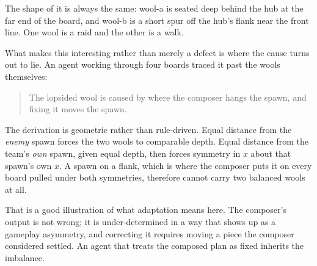 The shape of it is always the same: wool-a is seated deep behind the hub at the
far end of the board, and wool-b is a short spur off the hub's flank near the
front line. One wool is a raid and the other is a walk.

What makes this interesting rather than merely a defect is where the cause turns
out to lie. An agent working through four boards traced it past the wools
themselves:

\begin{quote}
The lopsided wool is caused by where the composer hangs the spawn, and fixing it
moves the spawn.
\end{quote}

The derivation is geometric rather than rule-driven. Equal distance from the
\emph{enemy} spawn forces the two wools to comparable depth. Equal distance from
the team's \emph{own} spawn, given equal depth, then forces symmetry in $x$ about
that spawn's own $x$. A spawn on a flank, which is where the composer puts it on
every board pulled under both symmetries, therefore cannot carry two balanced
wools at all.

That is a good illustration of what adaptation means here. The composer's output
is not wrong; it is under-determined in a way that shows up as a
gameplay asymmetry, and correcting it requires moving a piece the composer
considered settled. An agent that treats the composed plan as fixed inherits the
imbalance.
